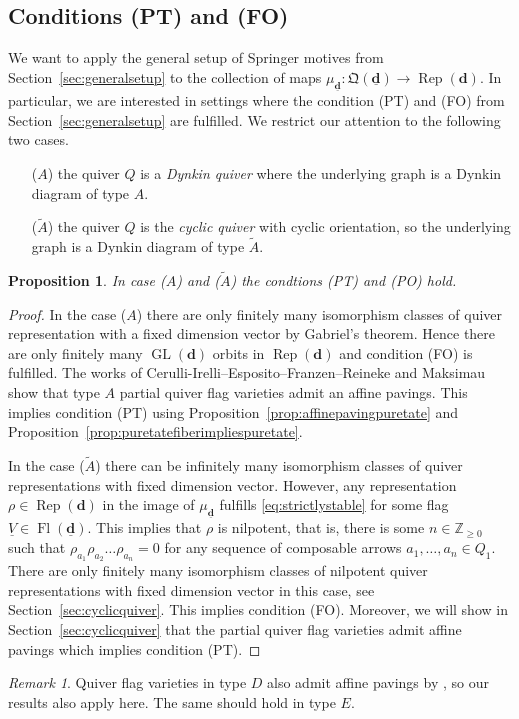 \documentclass{amsart}
\theoremstyle{plain}
\newtheorem{proposition}[theorem]{Proposition}
\theoremstyle{TheoremNum}
\theoremstyle{definition}
\theoremstyle{remark}
\newtheorem{remark}[theorem]{Remark}
\numberwithin{equation}{section}
\newcommand{\Z}{\mathbb{Z}}
\newcommand{\QQ}{\mathfrak{Q}}
\newcommand{\GL}{\operatorname{GL}}
\newcommand{\Fl}{\operatorname{Fl}}
\newcommand{\Rep}{\operatorname{Rep}}
\begin{document}
\subsection{Conditions (PT) and (FO)}\label{sec:conditionsptandfo}
We want to apply the general setup of Springer motives from Section~\ref{sec:generalsetup} to the collection of maps $\mu_{\underline{\mathbf{d}}}:\QQ(\underline{\mathbf{d}})\to \Rep(\mathbf{d}).$ In particular, we are interested in settings where the condition (PT) and (FO) from Section~\ref{sec:generalsetup} are fulfilled. We restrict our attention to the following two cases.
\begin{enumerate}
    \item[($A$)] the quiver $Q$ is a \emph{Dynkin quiver} where the underlying graph is a Dynkin diagram of type $A.$
    \item[($\widetilde{A}$)] the quiver $Q$ is the \emph{cyclic quiver} with cyclic orientation, so the underlying graph is a Dynkin diagram of type $\widetilde{A}$.
\end{enumerate}
\begin{proposition}\label{prop:condictionsptandpointypea}
In case ($A$) and ($\widetilde{A}$) the condtions (PT) and (PO) hold.
\end{proposition}
\begin{proof}
In the case ($A$) there are only finitely many isomorphism classes of quiver representation with a fixed dimension vector by Gabriel's theorem. 
Hence there are only finitely many $\GL(\mathbf{d})$ orbits in $\Rep(\mathbf{d})$ and condition (FO) is fulfilled. 
The works of Cerulli-Irelli--Esposito--Franzen--Reineke \cite{cerulli_irelli_cell_2021} and Maksimau \cite{maksimau_flag_2019} show that type $A$ partial quiver flag varieties admit an affine pavings. 
This implies condition (PT) using Proposition~\ref{prop:affinepavingpuretate} and Proposition~\ref{prop:puretatefiberimpliespuretate}. 

In the case ($\widetilde{A}$) there can be infinitely many isomorphism classes of quiver representations with fixed dimension vector. 
However, any representation $\rho\in \Rep(\mathbf{d})$ in the image of $\mu_{\underline{\mathbf{d}}}$ fulfills \eqref{eq:strictlystable} for some flag $\underline{V}\in \Fl(\underline{\mathbf{d}}).$ 
This implies that $\rho$ is nilpotent, that is, there is some $n\in \Z_{\geq 0}$ such that $\rho_{a_1}\rho_{a_2}\dots\rho_{a_n}=0$ for any sequence of composable arrows $a_1,\dots,a_n\in Q_1.$ 
There are only finitely many isomorphism classes of nilpotent quiver representations with fixed dimension vector in this case, see Section~\ref{sec:cyclicquiver}. 
This implies condition (FO). 
Moreover, we will show in Section~\ref{sec:cyclicquiver} that the partial quiver flag varieties admit affine pavings which implies condition (PT).
\end{proof}
\begin{remark}
Quiver flag varieties in type $D$ also admit affine pavings by \cite{maksimau_flag_2019}, so our results also apply here. The same should hold in type $E.$ %
\end{remark}
\end{document}
